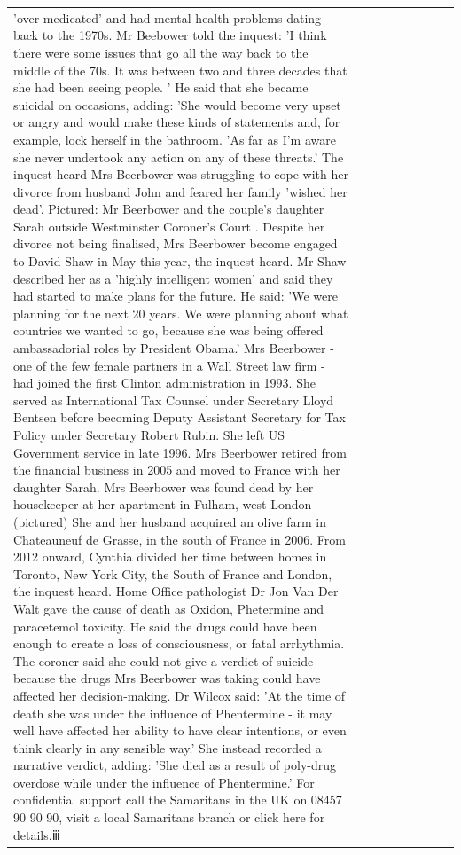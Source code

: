 \begin{table}[H]
\begin{tabular}{lllrlllll}
'over-medicated' and had mental health problems dating back to the 1970s. Mr Beebower told the inquest: 'I think there were some issues that go all the way back to the middle of the 70s. It was between two and three decades that she had been seeing people. ' He said that she became suicidal on occasions, adding: 'She would become very upset or angry and would make these kinds of statements and, for example, lock herself in the bathroom. 'As far as I'm aware she never undertook any action on any of these threats.' The inquest heard Mrs Beerbower was struggling to cope with her divorce from husband John and feared her family 'wished her dead'. Pictured: Mr Beerbower and the couple's daughter Sarah outside Westminster Coroner's Court . Despite her divorce not being finalised, Mrs Beerbower become engaged to David Shaw in May this year, the inquest heard. Mr Shaw described her as a 'highly intelligent women' and said they had started to make plans for the future. He said: 'We were planning for the next 20 years. We were planning about what countries we wanted to go, because she was being offered ambassadorial roles by President Obama.' Mrs Beerbower - one of the few female partners in a Wall Street law firm - had joined the first Clinton administration in 1993. She served as International Tax Counsel under Secretary Lloyd Bentsen before becoming Deputy Assistant Secretary for Tax Policy under Secretary Robert Rubin. She left US Government service in late 1996. Mrs Beerbower retired from the financial business in 2005 and moved to France with her daughter Sarah. Mrs Beerbower was found dead by her housekeeper at her apartment in Fulham, west London (pictured) She and her husband acquired an olive farm in Chateauneuf de Grasse, in the south of France in 2006. From 2012 onward, Cynthia divided her time between homes in Toronto, New York City, the South of France and London, the inquest heard. Home Office pathologist Dr Jon Van Der Walt gave the cause of death as Oxidon, Phetermine and paracetemol toxicity. He said the drugs could have been enough to create a loss of consciousness, or fatal arrhythmia. The coroner said she could not give a verdict of suicide because the drugs Mrs Beerbower was taking could have affected her decision-making. Dr Wilcox said: 'At the time of death she was under the influence of Phentermine - it may well have affected her ability to have clear intentions, or even think clearly in any sensible way.' She instead recorded a narrative verdict, adding: 'She died as a result of poly-drug overdose while under the influence of Phentermine.' For confidential support call the Samaritans in the UK on 08457 90 90 90, visit a local Samaritans branch or click here for details.ⅲ \\

\end{tabular}
\end{table}
